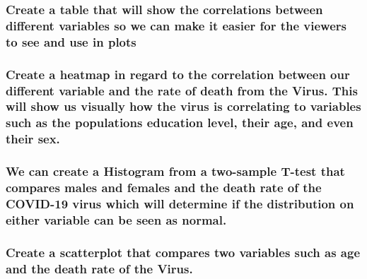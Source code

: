 \documentclass[
]{article}
\begin{document}
\hypertarget{create-a-table-that-will-show-the-correlations-between-different-variables-so-we-can-make-it-easier-for-the-viewers-to-see-and-use-in-plots}{%
\subsubsection{Create a table that will show the correlations between
different variables so we can make it easier for the viewers to see and
use in
plots}\label{create-a-table-that-will-show-the-correlations-between-different-variables-so-we-can-make-it-easier-for-the-viewers-to-see-and-use-in-plots}}

\hypertarget{create-a-heatmap-in-regard-to-the-correlation-between-our-different-variable-and-the-rate-of-death-from-the-virus.-this-will-show-us-visually-how-the-virus-is-correlating-to-variables-such-as-the-populations-education-level-their-age-and-even-their-sex.}{%
\subsubsection{Create a heatmap in regard to the correlation between our
different variable and the rate of death from the Virus. This will show
us visually how the virus is correlating to variables such as the
populations education level, their age, and even their
sex.}\label{create-a-heatmap-in-regard-to-the-correlation-between-our-different-variable-and-the-rate-of-death-from-the-virus.-this-will-show-us-visually-how-the-virus-is-correlating-to-variables-such-as-the-populations-education-level-their-age-and-even-their-sex.}}

\hypertarget{we-can-create-a-histogram-from-a-two-sample-t-test-that-compares-males-and-females-and-the-death-rate-of-the-covid-19-virus-which-will-determine-if-the-distribution-on-either-variable-can-be-seen-as-normal.}{%
\subsubsection{We can create a Histogram from a two-sample T-test that
compares males and females and the death rate of the COVID-19 virus
which will determine if the distribution on either variable can be seen
as
normal.}\label{we-can-create-a-histogram-from-a-two-sample-t-test-that-compares-males-and-females-and-the-death-rate-of-the-covid-19-virus-which-will-determine-if-the-distribution-on-either-variable-can-be-seen-as-normal.}}

\hypertarget{create-a-scatterplot-that-compares-two-variables-such-as-age-and-the-death-rate-of-the-virus.}{%
\subsubsection{Create a scatterplot that compares two variables such as
age and the death rate of the
Virus.}\label{create-a-scatterplot-that-compares-two-variables-such-as-age-and-the-death-rate-of-the-virus.}}
\end{document}
